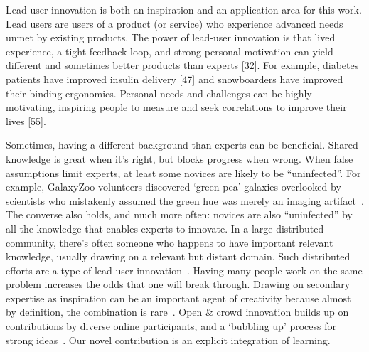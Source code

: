 Lead-user innovation is both an inspiration and an application area for this work. Lead users are
users of a product (or service) who experience advanced needs unmet by existing products. The
power of lead-user innovation is that lived experience, a tight feedback loop, and strong personal
motivation can yield different and sometimes better products than experts [32]. For example, diabetes
patients have improved insulin delivery [47] and snowboarders have improved their binding
ergonomics. Personal needs and challenges can be highly motivating, inspiring people to
measure and seek correlations to improve their lives [55].

Sometimes, having a different background than experts can be beneficial. Shared knowledge is great when it’s right, but blocks progress when wrong. When false assumptions limit experts, at least some novices are likely to be “uninfected”. For example, GalaxyZoo volunteers discovered ‘green pea’ galaxies overlooked by scientists who mistakenly assumed the green hue was merely an imaging artifact~\cite{Tinati2015}. The converse also holds, and much more often: novices are also “uninfected” by all the knowledge that enables experts to innovate. In a large distributed community, there’s often someone who happens to have important relevant knowledge, usually drawing on a relevant but distant domain. Such distributed efforts are a type of lead-user innovation~\cite{VonHippel2005a}. Having many people work on the same problem increases the odds that one will break through. Drawing on secondary expertise as inspiration can be an important agent of creativity because almost by definition, the combination is rare~\cite{Boden2004}. Open \& crowd innovation builds up on contributions by diverse online participants, and a ‘bubbling up’ process for strong ideas~\cite{Yu2012}. Our novel contribution is an explicit integration of learning.



